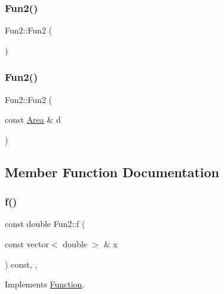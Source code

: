 \subsubsection{\texorpdfstring{Fun2()}{Fun2()}\hspace{0.1cm}{\footnotesize\ttfamily [1/2]}}
{\footnotesize\ttfamily Fun2\+::\+Fun2 (\begin{DoxyParamCaption}{ }\end{DoxyParamCaption})}

\mbox{\label{class_fun2_a07884d5793a0d74008d0125757d4ecda}} 
\subsubsection{\texorpdfstring{Fun2()}{Fun2()}\hspace{0.1cm}{\footnotesize\ttfamily [2/2]}}
{\footnotesize\ttfamily Fun2\+::\+Fun2 (\begin{DoxyParamCaption}\item[{const \hyperlink{class_area}{Area} \&}]{d }\end{DoxyParamCaption})}



\subsection{Member Function Documentation}
\mbox{\label{class_fun2_a6e9544da42cee65e9cbc8b56b233877c}} 
\subsubsection{\texorpdfstring{f()}{f()}}
{\footnotesize\ttfamily const double Fun2\+::f (\begin{DoxyParamCaption}\item[{const vector$<$ double $>$ \&}]{x }\end{DoxyParamCaption}) const\hspace{0.3cm}{\ttfamily [inline]}, {\ttfamily [override]}, {\ttfamily [virtual]}}



Implements \hyperlink{class_function_a81ec299f137e34109246cde88d88c949}{Function}.

\mbox{\label{class_fun2_ac5702f1a8350b7a7f4b796b99cd5b08f}} 
